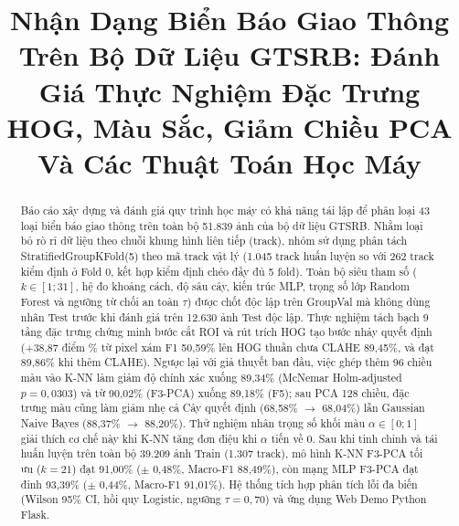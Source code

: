 \documentclass[conference]{IEEEtran}
\begin{document}
\title{Nhận Dạng Biển Báo Giao Thông Trên Bộ Dữ Liệu GTSRB: Đánh Giá Thực Nghiệm Đặc Trưng HOG, Màu Sắc, Giảm Chiều PCA Và Các Thuật Toán Học Máy}

\author{%
}

\maketitle

\begin{abstract}
Báo cáo xây dựng và đánh giá quy trình học máy có khả năng tái lập để phân loại 43 loại biển báo giao thông trên toàn bộ 51.839 ảnh của bộ dữ liệu GTSRB. Nhằm loại bỏ rò rỉ dữ liệu theo chuỗi khung hình liên tiếp (track), nhóm sử dụng phân tách StratifiedGroupKFold(5) theo mã track vật lý (1.045 track huấn luyện so với 262 track kiểm định ở Fold 0, kết hợp kiểm định chéo đầy đủ 5 fold). Toàn bộ siêu tham số ($k \in [1; 31]$, hệ đo khoảng cách, độ sâu cây, kiến trúc MLP, trọng số lớp Random Forest và ngưỡng từ chối an toàn $\tau$) được chốt độc lập trên GroupVal mà không dùng nhãn Test trước khi đánh giá trên 12.630 ảnh Test độc lập. Thực nghiệm tách bạch 9 tầng đặc trưng chứng minh bước cắt ROI và rút trích HOG tạo bước nhảy quyết định (+38,87 điểm \% từ pixel xám F1 50,59\% lên HOG thuần chưa CLAHE 89,45\%, và đạt 89,86\% khi thêm CLAHE). Ngược lại với giả thuyết ban đầu, việc ghép thêm 96 chiều màu vào K-NN làm giảm độ chính xác xuống 89,34\% (McNemar Holm-adjusted $p = 0,0303$) và từ 90,02\% (F3-PCA) xuống 89,18\% (F5); sau PCA 128 chiều, đặc trưng màu cũng làm giảm nhẹ cả Cây quyết định (68,58\% $\rightarrow$ 68,04\%) lẫn Gaussian Naive Bayes (88,37\% $\rightarrow$ 88,20\%). Thử nghiệm nhân trọng số khối màu $\alpha \in [0; 1]$ giải thích cơ chế này khi K-NN tăng đơn điệu khi $\alpha$ tiến về 0. Sau khi tinh chỉnh và tái huấn luyện trên toàn bộ 39.209 ảnh Train (1.307 track), mô hình K-NN F3-PCA tối ưu ($k=21$) đạt 91,00\% ($\pm$ 0,48\%, Macro-F1 88,49\%), còn mạng MLP F3-PCA đạt đỉnh 93,39\% ($\pm$ 0,44\%, Macro-F1 91,01\%). Hệ thống tích hợp phân tích lỗi đa biến (Wilson 95\% CI, hồi quy Logistic, ngưỡng $\tau = 0{,}70$) và ứng dụng Web Demo Python Flask.
\end{abstract}
\end{document}
